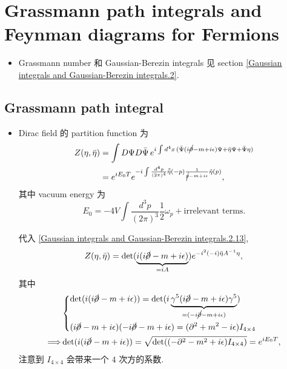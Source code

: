 \chapter{Grassmann path integrals and Feynman diagrams for Fermions}
\begin{itemize}
	\item Grassmann number 和 Gaussian-Berezin integrals 见 section \ref{Gaussian integrals and Gaussian-Berezin integrals.2}.
\end{itemize}

\section{Grassmann path integral}
\begin{itemize}
	\item Dirac field 的 partition function 为
	\begin{align}
		Z(\eta, \bar{\eta}) &= \int D\Psi D\bar{\Psi} \, e^{i \int d^4 x \, (\bar{\Psi} (i \cancel{\partial} - m + i \epsilon) \Psi + \bar{\eta} \Psi + \bar{\Psi} \eta)} \notag \\
		&= e^{i E_0 T} e^{- i \int \frac{d^4 p}{(2 \pi)^4} \tilde{\bar{\eta}}(- p) \frac{1}{\cancel{p} - m + i \epsilon} \tilde{\eta}(p)},
	\end{align}
	其中 vacuum energy 为
	\begin{equation}
		E_0 = - 4 V \int \frac{d^3 p}{(2 \pi)^3} \frac{1}{2} \omega_p + \text{irrelevant terms}.
	\end{equation}
	
	\begin{tcolorbox}[title=calculation:]
		代入 \eqref{Gaussian integrals and Gaussian-Berezin integrals.2.13},
		\begin{equation}
			Z(\eta, \bar{\eta}) = \det(\underbrace{i (i \cancel{\partial} - m + i \epsilon)}_{= i A}) e^{- i^2 (- i) \bar{\eta} A^{- 1} \eta},
		\end{equation}
		其中
		\begin{align}
			& \begin{dcases}
				\det(i (i \cancel{\partial} - m + i \epsilon)) = \det(i \underbrace{\gamma^5 (i \cancel{\partial} - m + i \epsilon) \gamma^5}_{= (- i \cancel{\partial} - m + i \epsilon)}) \\
				(i \cancel{\partial} - m + i \epsilon) (- i \cancel{\partial} - m + i \epsilon) = (\partial^2 + m^2 - i \epsilon) I_{4 \times 4}
			\end{dcases} \notag \\
			\Longrightarrow & \det(i (i \cancel{\partial} - m + i \epsilon)) = \sqrt{\det((- \partial^2 - m^2 + i \epsilon) I_{4 \times 4})} = e^{i E_0 T},
		\end{align}
		注意到 $I_{4 \times 4}$ 会带来一个 $4$ 次方的系数.
		

\end{tcolorbox}
\end{itemize}
